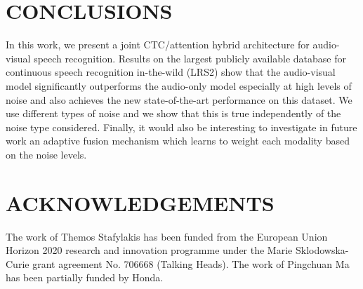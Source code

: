\documentclass{article}
\begin{document}




\section{CONCLUSIONS}
In this work, we present a joint CTC/attention hybrid architecture for audio-visual speech recognition. Results on the largest publicly available database for continuous speech recognition in-the-wild (LRS2) show that the audio-visual model significantly outperforms the audio-only model especially at high levels of noise and also achieves the new state-of-the-art performance on this dataset. We use different types of noise and we show that this is true independently of the noise type considered. Finally, it would also be interesting to investigate in future work an adaptive fusion mechanism which learns to weight each modality based on the noise levels.







\section{ACKNOWLEDGEMENTS}
The work of Themos Stafylakis has been funded from the European Union Horizon 2020 research and innovation programme under the Marie Sklodowska-Curie grant agreement No. 706668 (Talking Heads). The work of Pingchuan Ma has been partially funded by Honda.









\end{document}

